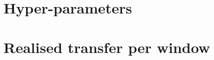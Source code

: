 \documentclass{article}
\theoremstyle{remark}
\begin{document}
\section{Hyper-parameters}
\label{app:hyper}
\begin{table}[h]
\centering
\small

\caption{Settings of the from-scratch E1 comparison (identical for all methods except the donor set). The main task B differs in
the number of agents (6), requests per team (3), communication range (3), team reward and goal positions.}
\end{table}

\section{Realised transfer per window}
\begin{table}[h]
\centering
\small

\caption{Realised transfer on E1 per training window (one seed). Arcs are directed receiver--donor links.}
\end{table}
\end{document}
